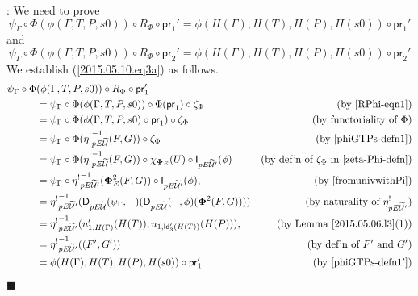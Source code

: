 \documentclass[12pt]{article}
\numberwithin{equation}{section}
\newenvironment{eq}{\begin{equation}}{\end{equation}}
\newenvironment{myproof}{{\bf Proof}:}{$\blacksquare$ \vskip 5mm }
\newcommand{\by}[1]{\text{(by #1)}}
\newcommand{\wt}{\widetilde}
\newcommand{\Idx}{\mathsf{Id}_3} %
\newcommand{\U}{\mathcal{U}}
\newcommand{\D}{\mathsf{D}}
\newcommand{\I}{\mathsf{I}}
\newcommand{\etashriek}{\eta^!}
\newcommand{\etaunshriek}{{\etashriek}^{-1}}
\newcommand{\pr}{\mathsf{pr}}
\begin{document}
\begin{myproof}
We need to prove
%
\begin{eq}
\label{2015.05.10.eq3a} \psi_{\Gamma}\circ \Phi(\phi(\Gamma,T,P,s0))\circ
R_{\Phi}\circ \pr_1' = \phi(H(\Gamma),H(T),H(P),H(s0))\circ \pr_1'
\end{eq}%
%
and
%
%
\begin{eq}
\label{2015.05.10.eq3b} \psi_{\Gamma}\circ \Phi(\phi(\Gamma,T,P,s0))\circ
R_{\Phi}\circ \pr_2' = \phi(H(\Gamma),H(T),H(P),H(s0))\circ \pr_2'
\end{eq}%
%
We establish (\ref{2015.05.10.eq3a}) as follows.
%
\begin{align*}
        \psi_{\Gamma}\circ \Phi&(\phi(\Gamma,T,P,s0))\circ R_{\Phi}\circ \pr_1'                                         \\
    & = \psi_{\Gamma}\circ \Phi (\phi(\Gamma,T,P,s0))\circ \Phi(\pr_1)\circ \zeta_{\Phi}                            & \by{\ref{RPhi-eqn1}}         \\
    & = \psi_{\Gamma}\circ \Phi (\phi(\Gamma,T,P,s0) \circ      \pr_1)\circ \zeta_{\Phi}                            & \by{functoriality of $\Phi$} \\
    & = \psi_{\Gamma}\circ \Phi(\etaunshriek_{pE\wt{\U}}(F,G))\circ \zeta_{\Phi}                                    & \by{\ref{phiGTPs-defn1}}     \\
    & = \psi_{\Gamma}\circ \Phi(\etaunshriek_{pE\wt{\U}}(F,G))\circ \chi_{{\bf \Phi}_E}(U) \circ \I_{pE\wt{\U}'}(\phi) & \by{def'n of $\zeta_{\Phi}$ in \ref{zeta-Phi-defn}} \\
    & = \psi_{\Gamma}\circ\etaunshriek_{pE\wt{\U}'}({\bf\Phi}^2_E(F,G))\circ \I_{pE\wt{\U}'}(\phi),                 & \by{\cite[Lemma 5.8]{fromunivwithPi}} \\
    & = \etaunshriek_{pE\wt{\U}'}(\D_{pE\wt{\U}}(\psi_{\Gamma},\_)(\D_{pE\wt{\U}}(\_,\phi)({\bf\Phi}^2(F,G))))      & \by{naturality of $\etashriek_{pE\wt{\U}'}$}    \\
    & = \etaunshriek_{pE\wt{\U}'} (u_{1,H(\Gamma)}'(H(T)),u_{1,\Idx'(H(T))}     (H(P))),                            & \by{Lemma \ref{2015.05.06.l3}(1)} \\
    & = \etaunshriek_{pE\wt{\U}'} ((F',G'))                                                                         & \by{def'n of $F'$ and $G'$} \\
    & = \phi(H(\Gamma),H(T),H(P),H(s0)) \circ \pr_1'                                                                & \by{\ref{phiGTPs-defn1'}}
\end{align*}


\end{myproof}
\end{document}

